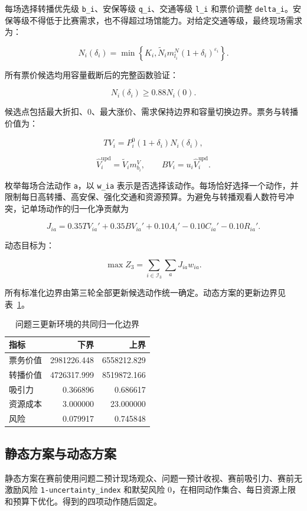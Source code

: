 每场选择转播优先级 \texttt{b\_i}、安保等级 \texttt{q\_i}、交通等级 \texttt{l\_i} 和票价调整 \texttt{delta\_i}。安保等级不得低于比赛需求，也不得超过场馆能力。对给定交通等级，最终现场需求为：

\[
N_i(\delta_i)=\min\left\{
K_i,\widetilde N_i m_{l_i}^{N}(1+\delta_i)^{\varepsilon_i}
\right\}.
\]

所有票价候选均用容量截断后的完整函数验证：

\[
N_i(\delta_i)\ge 0.88N_i(0).
\]

候选点包括最大折扣、0、最大涨价、需求保持边界和容量切换边界。票务与转播价值为：

\[
TV_i=P_i^0(1+\delta_i)N_i(\delta_i),
\]

\[
\widehat V_i^{\mathrm{upd}}=\widetilde V_i m_{b_i}^{V},\qquad
BV_i=u_i\widehat V_i^{\mathrm{upd}}.
\]

枚举每场合法动作 \texttt{a}，以 \texttt{w\_ia} 表示是否选择该动作。每场恰好选择一个动作，并限制每日高转播、高安保、强化交通和资源预算。为避免与转播观看人数符号冲突，记单场动作的归一化净贡献为

\[
J_{ia}=0.35TV_{ia}'+0.35BV_{ia}'+0.10A_i'
-0.10C_{ia}'-0.10R_{ia}'.
\]

动态目标为：

\[
\max Z_3=\sum_{i\in\mathcal I_3}
\sum_a J_{ia}w_{ia}.
\]

所有标准化边界由第三轮全部更新候选动作统一确定。动态方案的更新边界见表~\ref{tab:q3-bounds}。

\begin{longtable}[]{@{}lrr@{}}
\caption{问题三更新环境的共同归一化边界}\label{tab:q3-bounds}\\
\toprule\noalign{}
指标 & 下界 & 上界 \\
\midrule\noalign{}
\endhead
\bottomrule\noalign{}
\endlastfoot
票务价值 & 2981226.448 & 6558212.829 \\
转播价值 & 4726317.999 & 8519872.166 \\
吸引力 & 0.366896 & 0.686617 \\
资源成本 & 3.000000 & 23.000000 \\
风险 & 0.079917 & 0.745848 \\
\end{longtable}

\subsection{静态方案与动态方案}

静态方案在赛前使用问题二预计现场观众、问题一预计收视、赛前吸引力、赛前无激励风险 \texttt{1-uncertainty\_index} 和默契风险 0，在相同动作集合、每日资源上限和预算下优化。得到的四项动作随后固定。

